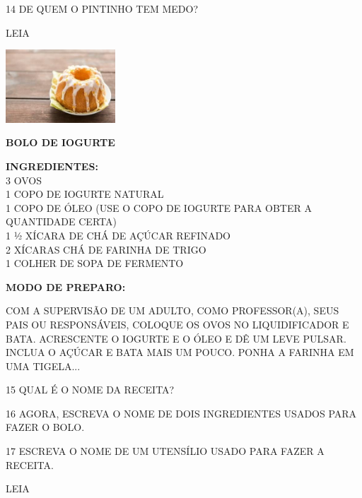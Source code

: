 \num{14} DE QUEM O PINTINHO TEM MEDO?


LEIA

\includegraphics[width=1.61944in,height=1.07917in]{media/image130.jpg}

\textbf{BOLO DE IOGURTE}

\textbf{INGREDIENTES:}\\
3 OVOS\\
1 COPO DE IOGURTE NATURAL\\
1 COPO DE ÓLEO (USE O COPO DE IOGURTE PARA OBTER A QUANTIDADE CERTA)\\
1 ½ XÍCARA DE CHÁ DE AÇÚCAR REFINADO\\
2 XÍCARAS CHÁ DE FARINHA DE TRIGO\\
1 COLHER DE SOPA DE FERMENTO

\textbf{MODO DE PREPARO:}

COM A SUPERVISÃO DE UM ADULTO, COMO PROFESSOR(A), SEUS PAIS OU RESPONSÁVEIS, COLOQUE OS OVOS NO LIQUIDIFICADOR E BATA. ACRESCENTE O IOGURTE E O ÓLEO
E DÊ UM LEVE PULSAR. INCLUA O AÇÚCAR E BATA MAIS UM POUCO. PONHA A
FARINHA EM UMA TIGELA...



\num{15} QUAL É O NOME DA RECEITA?


\num{16} AGORA, ESCREVA O NOME DE DOIS INGREDIENTES USADOS PARA FAZER O BOLO.


\num{17} ESCREVA O NOME DE UM UTENSÍLIO USADO PARA FAZER A RECEITA.


LEIA

